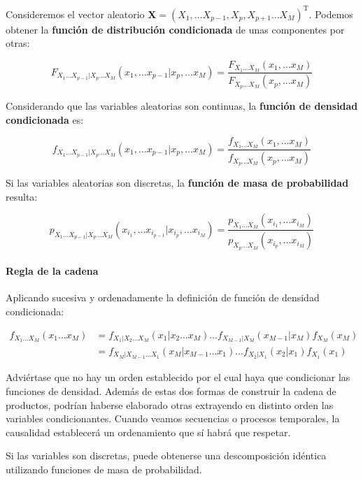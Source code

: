 \documentclass[11pt]{article}
\begin{document}
Consideremos el vector aleatorio
\(\mathbf{X} = (X_1, \ldots X_{p-1}, X_{p}, X_{p+1} \ldots X_M)^\mathrm{T}\).
Podemos obtener la \textbf{función de distribución condicionada} de unas
componentes por otras:

\[
F_{X_1 \ldots X_{p-1} | X_p \ldots X_M} (x_1 , \ldots x_{p-1} | x_p , \ldots x_M) = \frac{F_{X_1 \ldots X_M}(x_1 , \ldots x_M)}{F_{X_p \ldots X_M}(x_p, \ldots x_M)}
\]

Considerando que las variables aleatorias son continuas, la
\textbf{función de densidad condicionada} es:

\[
f_{X_1 \ldots X_{p-1} | X_p \ldots X_M} (x_1 , \ldots x_{p-1} | x_p , \ldots x_M) = \frac{f_{X_1 \ldots X_M}(x_1 , \ldots x_M)}{f_{X_p \ldots X_M}(x_p, \ldots x_M)}
\]

Si las variables aleatorias son discretas, la \textbf{función de masa de
probabilidad} resulta:

\[
p_{X_1 \ldots X_{p-1} | X_p \ldots X_M} (x_{i_1} , \ldots x_{i_{p-1}} | x_{i_p} , \ldots x_{i_M}) = \frac{p_{X_1 \ldots X_M}(x_{i_1} , \ldots x_{i_M})}{p_{X_{p} \ldots X_M}(x_{i_p}, \ldots x_{i_M})}
\]

    \hypertarget{regla-de-la-cadena}{%
\paragraph{Regla de la cadena}\label{regla-de-la-cadena}}

Aplicando sucesiva y ordenadamente la definición de función de densidad
condicionada:

\begin{align}
f_{X_1 \ldots X_M}(x_1 \ldots x_M) 
&= 
f_{X_1 | X_2 \ldots X_M} (x_1 | x_2 \ldots x_{M}) \ldots f_{X_{M-1} | X_M} (x_{M-1} | x_M) f_{X_M} (x_M)\\
&= 
f_{X_M | X_{M-1} \ldots X_1} (x_M | x_{M-1} \ldots x_{1}) \ldots f_{X_2 | X_1} (x_2 | x_1) f_{X_1} (x_1)
\end{align}

Adviértase que no hay un orden establecido por el cual haya que
condicionar las funciones de densidad. Además de estas dos formas de
construir la cadena de productos, podrían haberse elaborado otras
extrayendo en distinto orden las variables condicionantes. Cuando veamos
secuencias o procesos temporales, la causalidad establecerá un
ordenamiento que sí habrá que respetar.

Si las variables son discretas, puede obtenerse una descomposición
idéntica utilizando funciones de masa de probabilidad.
\end{document}
